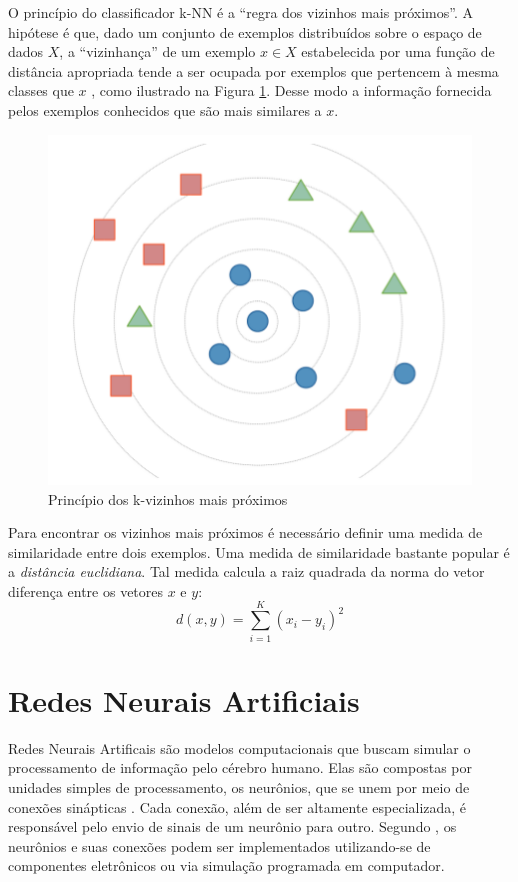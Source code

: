 O princípio do classificador k-NN é a ``regra dos vizinhos mais próximos''. A hipótese é que, dado um conjunto de exemplos distribuídos sobre o espaço de dados $X$, a ``vizinhança'' de um exemplo $x \in X$ estabelecida por uma função de distância apropriada tende a ser ocupada por exemplos que pertencem à mesma classes que $x$ \cite{hart1967} , como ilustrado na Figura \ref{fig-knn}. Desse modo a informação fornecida pelos exemplos conhecidos que são mais similares a $x$.

\begin{figure}[h]
	\centering
	\includegraphics[scale=0.5]{pasta1_figuras/knn.png}
	\caption{Princípio dos k-vizinhos mais próximos}
	\label{fig-knn}
\end{figure}

Para encontrar os vizinhos mais próximos é necessário definir uma medida de similaridade entre dois exemplos. Uma medida de similaridade bastante popular é a \textit{distância euclidiana}. Tal medida calcula a raiz quadrada da norma do vetor diferença entre os vetores $x$ e $y$:
\begin{equation} \label{eq_disteucli}
d(x,y)= \sum_{i=1}^{K} (x_i - y_i)^2
\end{equation}

\section{Redes Neurais Artificiais}
Redes Neurais Artificais são modelos computacionais que buscam simular o processamento de informação pelo cérebro humano. Elas são compostas por unidades simples de processamento, os neurônios, que se unem por meio de conexões sinápticas \cite{zhang1998}. Cada conexão, além de ser altamente especializada, é responsável pelo envio de sinais de um neurônio para outro. Segundo \cite{haykin2009}, os neurônios e suas conexões podem ser implementados utilizando-se de componentes eletrônicos ou via simulação programada em computador.

